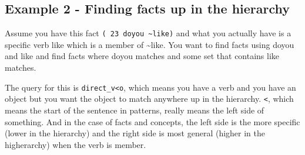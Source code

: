 \documentclass[]{article}
\begin{document}
\subsection{Example 2 - Finding facts up in the
hierarchy}\label{example-2---finding-facts-up-in-the-hierarchy}

Assume you have this fact \texttt{(\ 23\ doyou\ \textasciitilde{}like)}
and what you actually have is a specific verb like which is a member of
\textasciitilde{}like. You want to find facts using doyou and like and
find facts where doyou matches and some set that contains like matches.

The query for this is \texttt{direct\_v\textless{}o}, which means you
have a verb and you have an object but you want the object to match
anywhere up in the hierarchy. \texttt{\textless{}}, which means the
start of the sentence in patterns, really means the left side of
something. And in the case of facts and concepts, the left side is the
more specific (lower in the hierarchy) and the right side is most
general (higher in the higherarchy) when the verb is member.
\end{document}
